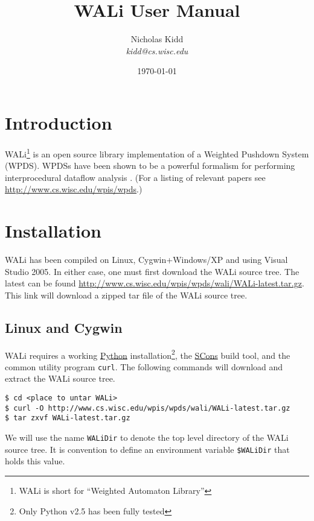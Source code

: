 \documentclass[english,a4paper,11pt]{article}
\title{WALi User Manual}
\date{\today}
\author{ Nicholas Kidd \\ { \emph{kidd@cs.wisc.edu}} }
\theoremstyle{definition}
\begin{document}
\maketitle

\section{Introduction}
\label{Se:Introduction}
WALi\footnote{WALi is short for ``Weighted Automaton Library''} is an open
source library implementation of a Weighted Pushdown System (WPDS). WPDSs have
been shown to be a powerful formalism for performing interprocedural dataflow
analysis \cite{SAS:RSJ:2003,SCP:RSJM:2005,FSTTCS:RLK:2007}. (For a listing of
relevant papers see \url{http://www.cs.wisc.edu/wpis/wpds}.)

\section{Installation}
\label{Se:Installation}
WALi has been compiled on Linux, Cygwin+Windows/XP and using
Visual Studio 2005. In either case, one must first download the WALi source
tree. The latest can be found
\href{http://www.cs.wisc.edu/wpis/wpds/wali/WALi-latest.tar.gz}{http://www.cs.wisc.edu/wpis/wpds/wali/WALi-latest.tar.gz}.
This link will download a zipped tar file of the WALi source tree.

\subsection{Linux and Cygwin}
\label{Se:Linux}
WALi requires a working \href{http://www.python.org}{Python}
installation\footnote{Only Python v2.5 has been fully tested},
the \href{http://www.scons.org}{SCons} build tool, and the common utility
program \verb!curl!. The following commands will download and extract the WALi
source tree.

\noindent
\begin{cmdbox}
\begin{verbatim}
$ cd <place to untar WALi>
$ curl -O http://www.cs.wisc.edu/wpis/wpds/wali/WALi-latest.tar.gz 
$ tar zxvf WALi-latest.tar.gz
\end{verbatim}
\end{cmdbox}

\noindent  We will use the name \verb!WALiDir! to denote the top level directory of the
WALi source tree. It is convention to define an environment variable
\verb!$WALiDir! that holds this value.
\end{document}
